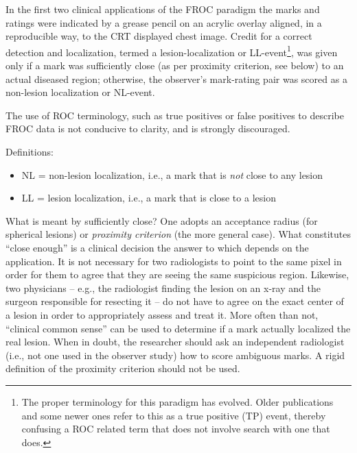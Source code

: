 \documentclass[
]{book}
\providecommand{\tightlist}{%
  \setlength{\itemsep}{0pt}\setlength{\parskip}{0pt}}
\begin{document}
In the first two clinical applications of the FROC paradigm \citep{Chakraborty1986DigitalVsConv, Niklason1986SimulatedPulmonary} the marks and ratings were indicated by a grease pencil on an acrylic overlay aligned, in a reproducible way, to the CRT displayed chest image. Credit for a correct detection and localization, termed a lesion-localization or LL-event\footnote{The proper terminology for this paradigm has evolved. Older publications and some newer ones refer to this as a true positive (TP) event, thereby confusing a ROC related term that does not involve search with one that does.}, was given only if a mark was sufficiently close (as per proximity criterion, see below) to an actual diseased region; otherwise, the observer's mark-rating pair was scored as a non-lesion localization or NL-event.

The use of ROC terminology, such as true positives or false positives to describe FROC data is not conducive to clarity, and is strongly discouraged.

Definitions:

\begin{itemize}
\tightlist
\item
  NL = non-lesion localization, i.e., a mark that is \emph{not} close to any lesion
\item
  LL = lesion localization, i.e., a mark that is close to a lesion
\end{itemize}

What is meant by sufficiently close? One adopts an acceptance radius (for spherical lesions) or \emph{proximity criterion} (the more general case). What constitutes ``close enough'' is a clinical decision the answer to which depends on the application. It is not necessary for two radiologists to point to the same pixel in order for them to agree that they are seeing the same suspicious region. Likewise, two physicians -- e.g., the radiologist finding the lesion on an x-ray and the surgeon responsible for resecting it -- do not have to agree on the exact center of a lesion in order to appropriately assess and treat it. More often than not, ``clinical common sense'' can be used to determine if a mark actually localized the real lesion. When in doubt, the researcher should ask an independent radiologist (i.e., not one used in the observer study) how to score ambiguous marks. A rigid definition of the proximity criterion should not be used.
\end{document}
